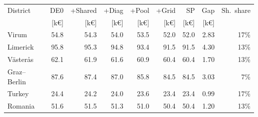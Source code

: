 \begin{tabular}{lrrrrrrrr}
\toprule
District & DE0 & +Shared & +Diag & +Pool & +Grid & SP & Gap & Sh.\ share \\
 & [k\euro] & [k\euro] & [k\euro] & [k\euro] & [k\euro] & [k\euro] & [k\euro] & \\
\midrule
Virum & 54.8 & 54.3 & 54.0 & 53.5 & 52.0 & 52.0 & 2.83 & 17\% \\
Limerick & 95.8 & 95.3 & 94.8 & 93.4 & 91.5 & 91.5 & 4.30 & 13\% \\
V\"aster\aa s & 62.1 & 61.9 & 61.6 & 60.9 & 60.4 & 60.4 & 1.70 & 13\% \\
Graz--Berlin & 87.6 & 87.4 & 87.0 & 85.8 & 84.5 & 84.5 & 3.03 & 7\% \\
Turkey & 24.4 & 24.2 & 24.0 & 23.6 & 23.4 & 23.4 & 0.99 & 17\% \\
Romania & 51.6 & 51.5 & 51.3 & 51.0 & 50.4 & 50.4 & 1.20 & 13\% \\
\bottomrule
\end{tabular}
